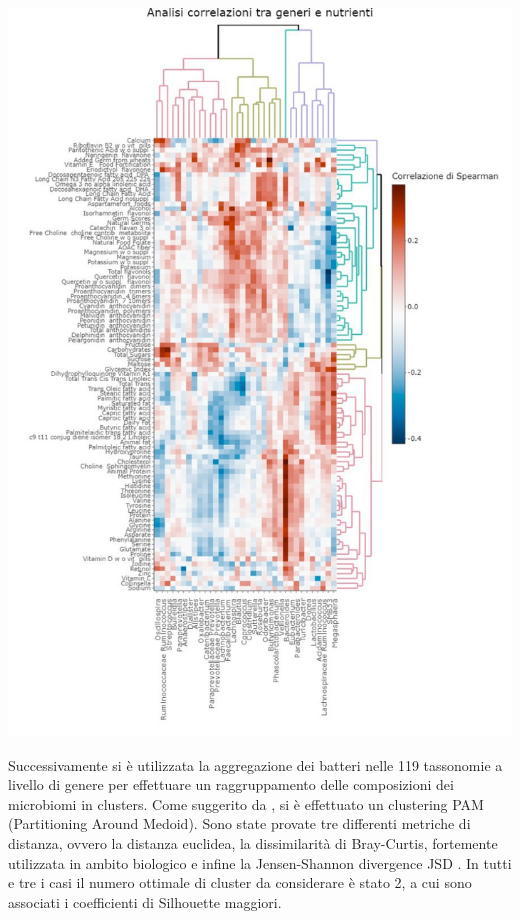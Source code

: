 \begin{Figure}
    \centering
    \includegraphics[width=\linewidth,keepaspectratio]{images/real_correlazione.jpeg}
  \end{Figure}

Successivamente si è utilizzata la aggregazione dei batteri nelle 119 tassonomie a livello di genere per effettuare un raggruppamento delle composizioni dei microbiomi in clusters. Come suggerito da \cite{paper}, si è effettuato un clustering PAM (Partitioning Around Medoid).
Sono state provate tre differenti metriche di distanza, ovvero la distanza euclidea, la dissimilarità di Bray-Curtis, fortemente utilizzata in ambito biologico e infine la Jensen-Shannon divergence JSD \cite{jsd}. In tutti e tre i casi il numero ottimale di cluster da considerare è stato 2, a cui sono associati i coefficienti di Silhouette maggiori. 

